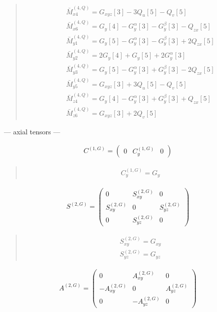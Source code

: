 \documentclass[fleqn,10pt]{jsarticle}
\begin{document}
\begin{quote}
\begin{align*}
& \bar{M}^{(4,Q)}_{x4} = G_{xyz}[3] - 3 Q_{u}[5] - Q_{v}[5] \\
& \bar{M}^{(4,Q)}_{x6} = G_{y}[4] - G_{y}^{\alpha}[3] - G_{y}^{\beta}[3] - Q_{zx}[5] \\
& \bar{M}^{(4,Q)}_{y1} = G_{y}[5] - G_{y}^{\alpha}[3] - G_{y}^{\beta}[3] + 2 Q_{zx}[5] \\
& \bar{M}^{(4,Q)}_{y2} = 2 G_{y}[4] + G_{y}[5] + 2 G_{y}^{\alpha}[3] \\
& \bar{M}^{(4,Q)}_{y3} = G_{y}[5] - G_{y}^{\alpha}[3] + G_{y}^{\beta}[3] - 2 Q_{zx}[5] \\
& \bar{M}^{(4,Q)}_{y5} = G_{xyz}[3] + 3 Q_{u}[5] - Q_{v}[5] \\
& \bar{M}^{(4,Q)}_{z4} = G_{y}[4] - G_{y}^{\alpha}[3] + G_{y}^{\beta}[3] + Q_{zx}[5] \\
& \bar{M}^{(4,Q)}_{z6} = G_{xyz}[3] + 2 Q_{v}[5]
\end{align*}
\end{quote}
\newpage
\begin{center}\LARGE --- axial tensors ---\end{center}
\begin{align*}
C^{(1,G)} = \begin{pmatrix} 0 & C^{(1,G)}_{y} & 0 \end{pmatrix}
\end{align*}
\begin{quote}
\begin{align*}
& C^{(1,G)}_{y} = G_{y}
\end{align*}
\end{quote}
\begin{align*}
S^{(2,G)} = \begin{pmatrix} 0 & S^{(2,G)}_{xy} & 0 \\ S^{(2,G)}_{xy} & 0 & S^{(2,G)}_{yz} \\ 0 & S^{(2,G)}_{yz} & 0 \end{pmatrix}
\end{align*}
\begin{quote}
\begin{align*}
& S^{(2,G)}_{xy} = G_{xy} \\
& S^{(2,G)}_{yz} = G_{yz}
\end{align*}
\end{quote}
\begin{align*}
A^{(2,G)} = \begin{pmatrix} 0 & A^{(2,G)}_{xy} & 0 \\ - A^{(2,G)}_{xy} & 0 & A^{(2,G)}_{yz} \\ 0 & - A^{(2,G)}_{yz} & 0 \end{pmatrix}
\end{align*}
\end{document}
